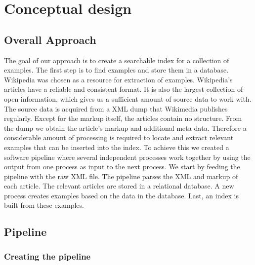 
\chapter{Conceptual design}\label{cap_3}



\section{Overall Approach}

The goal of our approach is to create a searchable index for a collection of examples. The first step is to find examples and store them in a database. Wikipedia was chosen as a resource for extraction of examples. Wikipedia's articles have a reliable and consistent format. It is also the largest collection of open information, which gives us a sufficient amount of source data to work with. The source data is acquired from a XML dump that Wikimedia publishes regularly. Except for the markup itself, the articles contain no structure. From the dump we obtain the article's markup and additional meta data. Therefore a considerable amount of processing is required to locate and extract relevant examples that can be inserted into the index. To achieve this we created a software pipeline where several independent processes work together by using the output from one process as input to the next process. We start by feeding the pipeline with the raw XML file. The pipeline parses the XML and markup of each article. The relevant articles are stored in a relational database. A new process creates examples based on the data in the database. Last, an index is built from these examples.

\section{Pipeline} \label{cd_pipeline}

\subsection{Creating the pipeline} \label{custom-pipeline}


